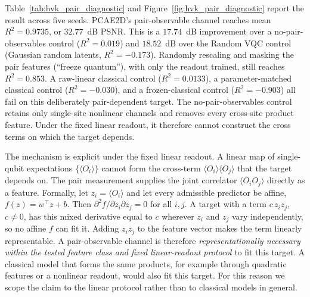 \documentclass[pdflatex,sn-basic]{sn-jnl}
\begin{document}
Table~\ref{tab:hvk_pair_diagnostic} and Figure~\ref{fig:hvk_pair_diagnostic} report the result across five seeds.
PCAE2D's pair-observable channel reaches mean $R^2=0.9735$, or $32.77$~dB PSNR.
This is a $17.74$~dB improvement over a no-pair-observables control ($R^2=0.019$) and $18.52$~dB over the Random VQC control (Gaussian random latents, $R^2=-0.173$).
Randomly rescaling and masking the pair features (``freeze quantum''), with only the readout trained, still reaches $R^2=0.853$.
A raw-linear classical control ($R^2=0.0133$), a parameter-matched classical control ($R^2=-0.030$), and a frozen-classical control ($R^2=-0.903$) all fail on this deliberately pair-dependent target.
The no-pair-observables control retains only single-site nonlinear channels and removes every cross-site product feature.
Under the fixed linear readout, it therefore cannot construct the cross terms on which the target depends.

The mechanism is explicit under the fixed linear readout.
A linear map of single-qubit expectations $\{\langle O_i\rangle\}$ cannot form the cross-term $\langle O_i\rangle\langle O_j\rangle$ that the target depends on.
The pair measurement supplies the joint correlator $\langle O_iO_j\rangle$ directly as a feature.
Formally, let $z_i=\langle O_i\rangle$ and let every admissible predictor be affine, $f(z)=w^{\top}z+b$.
Then $\partial^2 f/\partial z_i\partial z_j=0$ for all $i,j$.
A target with a term $c\,z_iz_j$, $c\neq0$, has this mixed derivative equal to $c$ wherever $z_i$ and $z_j$ vary independently, so no affine $f$ can fit it.
Adding $z_iz_j$ to the feature vector makes the term linearly representable.
A pair-observable channel is therefore \emph{representationally necessary within the tested feature class and fixed linear-readout protocol} to fit this target.
A classical model that forms the same products, for example through quadratic features or a nonlinear readout, would also fit this target.
For this reason we scope the claim to the linear protocol rather than to classical models in general.
\end{document}
